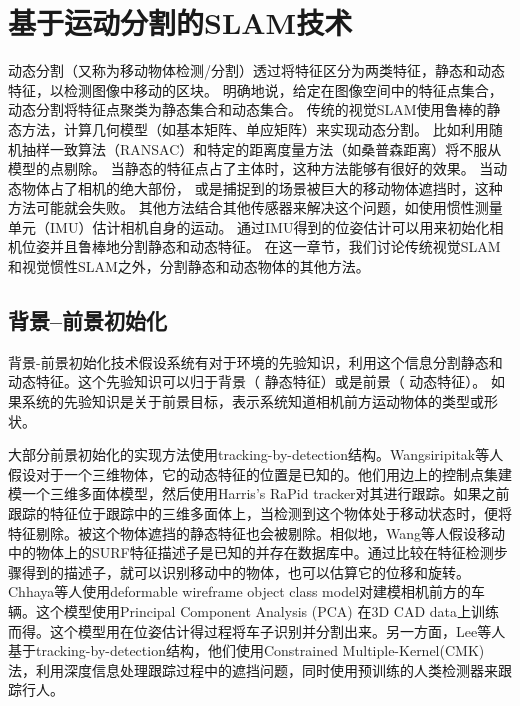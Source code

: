\section{基于运动分割的SLAM技术}
\label{subsec:motion_segmentation}

动态分割（又称为移动物体检测/分割\cite{Derome2015Moving, Klappstein2008Moving, Kundu2009Moving}）透过将特征区分为两类特征，静态和动态特征，以检测图像中移动的区块。
明确地说，给定在图像空间中的特征点集合，动态分割将特征点聚类为静态集合和动态集合。
传统的视觉SLAM使用鲁棒的静态方法，计算几何模型（如基本矩阵、单应矩阵）来实现动态分割。
比如利用随机抽样一致算法（RANSAC）\cite{Fischler1981Random}和特定的距离度量方法（如桑普森距离\cite{Hartley2008Multiple}）将不服从模型的点剔除。
当静态的特征点占了主体时，这种方法能够有很好的效果。
当动态物体占了相机的绝大部份， 或是捕捉到的场景被巨大的移动物体遮挡时，这种方法可能就会失败。
其他方法结合其他传感器来解决这个问题，如使用惯性测量单元（IMU）估计相机自身的运动\cite{Jones2011Visual, Leutenegger2014Keyframe}。
通过IMU得到的位姿估计可以用来初始化相机位姿并且鲁棒地分割静态和动态特征。
在这一章节，我们讨论传统视觉SLAM和视觉惯性SLAM之外，分割静态和动态物体的其他方法。

\subsection{背景--前景初始化}
背景-前景初始化技术假设系统有对于环境的先验知识，利用这个信息分割静态和动态特征。这个先验知识可以归于背景（ 静态特征）或是前景（ 动态特征）。
如果系统的先验知识是关于前景目标，表示系统知道相机前方运动物体的类型或形状。

大部分前景初始化的实现方法使用tracking-by-detection结构\cite{Breitenstein2010Online, Lee2014Driving}。Wangsiripitak等人\cite{Wangsiripitak2009Avoiding}假设对于一个三维物体，它的动态特征的位置是已知的。他们用边上的控制点集建模一个三维多面体模型，然后使用Harris’s RaPid tracker\cite{Harris1990RAPID}对其进行跟踪。如果之前跟踪的特征位于跟踪中的三维多面体上，当检测到这个物体处于移动状态时，便将特征剔除。被这个物体遮挡的静态特征也会被剔除。相似地，Wang等人\cite{Wang2010Visual}假设移动中的物体上的SURF特征描述子\cite{Bay2008Speeded}是已知的并存在数据库中。通过比较在特征检测步骤得到的描述子，就可以识别移动中的物体，也可以估算它的位移和旋转。Chhaya等人\cite{Chhaya2016Monocular}使用deformable wireframe object class model对建模相机前方的车辆。这个模型使用Principal Component Analysis (PCA) 在3D CAD data上训练而得。这个模型用在位姿估计得过程将车子识别并分割出来。另一方面，Lee等人\cite{Lee2014Driving, Lee2016Ground}基于tracking-by-detection结构，他们使用Constrained Multiple-Kernel(CMK)法，利用深度信息处理跟踪过程中的遮挡问题，同时使用预训练的人类检测器来跟踪行人。

